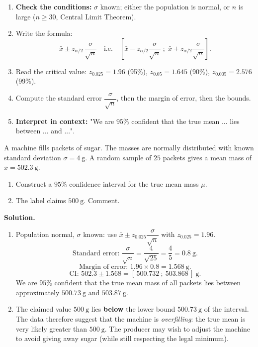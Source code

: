 \documentclass[11pt]{article}
\begin{document}
\begin{methode}
\begin{enumerate}
\item \textbf{Check the conditions:} $\sigma$ known; either the population is normal, or $n$ is large ($n\ge 30$, Central Limit Theorem).
\item Write the formula:
\[
\bar{x}\pm z_{\alpha/2}\,\frac{\sigma}{\sqrt{n}}
\quad\text{i.e.}\quad
\left[\bar{x}-z_{\alpha/2}\frac{\sigma}{\sqrt{n}}\;;\;\bar{x}+z_{\alpha/2}\frac{\sigma}{\sqrt{n}}\right].
\]
\item Read the critical value: $z_{0.025}=1.96$ (95\%), $z_{0.05}=1.645$ (90\%), $z_{0.005}=2.576$ (99\%).
\item Compute the standard error $\dfrac{\sigma}{\sqrt{n}}$, then the margin of error, then the bounds.
\item \textbf{Interpret in context:} "We are $95\%$ confident that the true mean ... lies between ... and ...".
\end{enumerate}
\end{methode}

\begin{exoresolu}
A machine fills packets of sugar. The masses are normally distributed with known standard deviation $\sigma = 4\ \mathrm{g}$. A random sample of $25$ packets gives a mean mass of $\bar{x}=502.3\ \mathrm{g}$.
\begin{enumerate}
\item Construct a $95\%$ confidence interval for the true mean mass $\mu$.
\item The label claims $500\ \mathrm{g}$. Comment.
\end{enumerate}
\tcblower
\textbf{Solution.}
\begin{enumerate}
\item Population normal, $\sigma$ known: use $\bar{x}\pm z_{0.025}\dfrac{\sigma}{\sqrt{n}}$ with $z_{0.025}=1.96$.
\[
\text{Standard error: } \frac{\sigma}{\sqrt{n}}=\frac{4}{\sqrt{25}}=\frac{4}{5}=0.8\ \mathrm{g}.
\]
\[
\text{Margin of error: } 1.96\times 0.8 = 1.568\ \mathrm{g}.
\]
\[
\text{CI: } 502.3\pm 1.568 = [\,500.732\ ;\ 503.868\,]\ \mathrm{g}.
\]
We are $95\%$ confident that the true mean mass of all packets lies between approximately $500.73\ \mathrm{g}$ and $503.87\ \mathrm{g}$.
\item The claimed value $500\ \mathrm{g}$ lies \textbf{below} the lower bound $500.73\ \mathrm{g}$ of the interval. The data therefore suggest that the machine is \emph{overfilling}: the true mean is very likely greater than $500\ \mathrm{g}$. The producer may wish to adjust the machine to avoid giving away sugar (while still respecting the legal minimum).
\end{enumerate}
\end{exoresolu}
\end{document}
